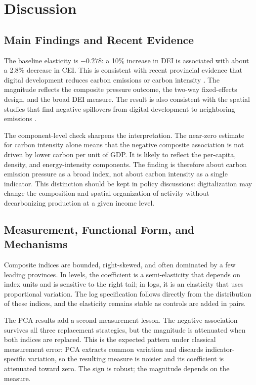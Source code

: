 \documentclass[economies,article,submit,moreauthors]{Definitions/mdpi}
\begin{document}
\section{Discussion}

\subsection{Main Findings and Recent Evidence}

The baseline elasticity is $-0.278$: a 10\% increase in DEI is associated with about a 2.8\% decrease in CEI. This is consistent with recent provincial evidence that digital development reduces carbon emissions or carbon intensity \citep{gao2024,huangwu2024,song2024,zhang2024sust,zhang2025}. The magnitude reflects the composite pressure outcome, the two-way fixed-effects design, and the broad DEI measure. The result is also consistent with the spatial studies that find negative spillovers from digital development to neighboring emissions \citep{yuan2024,wang2025,niu2024}.

The component-level check sharpens the interpretation. The near-zero estimate for carbon intensity alone means that the negative composite association is not driven by lower carbon per unit of GDP. It is likely to reflect the per-capita, density, and energy-intensity components. The finding is therefore about carbon emission pressure as a broad index, not about carbon intensity as a single indicator. This distinction should be kept in policy discussions: digitalization may change the composition and spatial organization of activity without decarbonizing production at a given income level.

\subsection{Measurement, Functional Form, and Mechanisms}

Composite indices are bounded, right-skewed, and often dominated by a few leading provinces. In levels, the coefficient is a semi-elasticity that depends on index units and is sensitive to the right tail; in logs, it is an elasticity that uses proportional variation. The log specification follows directly from the distribution of these indices, and the elasticity remains stable as controls are added in pairs.

The PCA results add a second measurement lesson. The negative association survives all three replacement strategies, but the magnitude is attenuated when both indices are replaced. This is the expected pattern under classical measurement error: PCA extracts common variation and discards indicator-specific variation, so the resulting measure is noisier and its coefficient is attenuated toward zero. The sign is robust; the magnitude depends on the measure.
\end{document}
